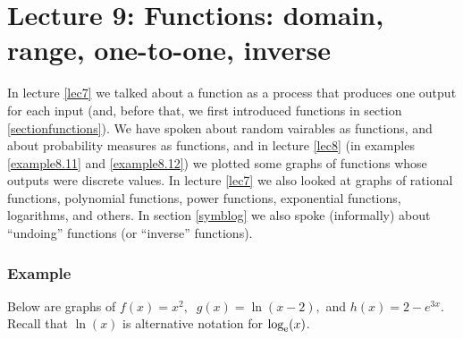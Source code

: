 \chapter{Lecture 9: Functions: domain, range, one-to-one, inverse}
In lecture \ref{lec7} we talked about a function as a process that produces one output for each input (and, before that, we first introduced functions in section \ref{sectionfunctions}). We have spoken about random vairables as functions, and about probability measures as functions, and in lecture \ref{lec8} (in examples \ref{example8.11} and \ref{example8.12}) we plotted some graphs of functions whose outputs were discrete values. In lecture \ref{lec7} we also looked at graphs of rational functions, polynomial functions, power functions, exponential functions, logarithms, and others. In section \ref{symblog} we also spoke (informally) about ``undoing'' functions (or ``inverse'' functions).  \\

\subsection{Example} \label{example9.1}
Below are graphs of $f(x) = x^2, \;\; g(x) = \ln(x - 2),$ and $h(x) = 2 - e^{3x}$. Recall that $\ln(x)$ is alternative notation for $\log_{\mathrm{e}}(x)$.

